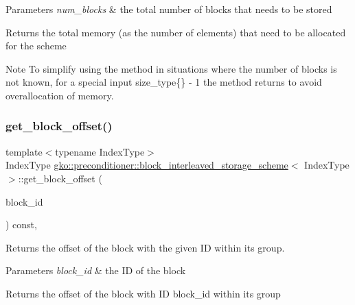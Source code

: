 \begin{DoxyParams}{Parameters}
{\em num\+\_\+blocks} & the total number of blocks that needs to be stored\\
\hline
\end{DoxyParams}
\begin{DoxyReturn}{Returns}
the total memory (as the number of elements) that need to be allocated for the scheme
\end{DoxyReturn}
\begin{DoxyNote}{Note}
To simplify using the method in situations where the number of blocks is not known, for a special input {\ttfamily size\+\_\+type\{\} -\/ 1} the method returns {} to avoid overallocation of memory. 
\end{DoxyNote}
\mbox{\label{structgko_1_1preconditioner_1_1block__interleaved__storage__scheme_a6384280dc1ad46fc1589d0b9165fd022}} 
\subsubsection{\texorpdfstring{get\+\_\+block\+\_\+offset()}{get\_block\_offset()}}
{\footnotesize\ttfamily template$<$typename Index\+Type$>$ \\
Index\+Type \hyperlink{structgko_1_1preconditioner_1_1block__interleaved__storage__scheme}{gko\+::preconditioner\+::block\+\_\+interleaved\+\_\+storage\+\_\+scheme}$<$ Index\+Type $>$\+::get\+\_\+block\+\_\+offset (\begin{DoxyParamCaption}\item[{Index\+Type}]{block\+\_\+id }\end{DoxyParamCaption}) const\hspace{0.3cm}{\ttfamily [inline]}, {\ttfamily [noexcept]}}



Returns the offset of the block with the given ID within its group. 


\begin{DoxyParams}{Parameters}
{\em block\+\_\+id} & the ID of the block\\
\hline
\end{DoxyParams}
\begin{DoxyReturn}{Returns}
the offset of the block with ID {\ttfamily block\+\_\+id} within its group 
\end{DoxyReturn}


